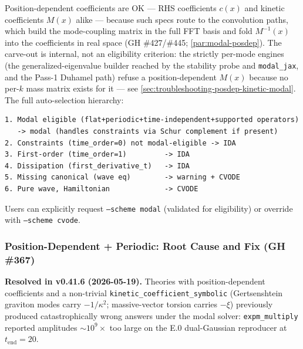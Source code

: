 Position-dependent coefficients are OK --- RHS coefficients $c(x)$ and
kinetic coefficients $M(x)$ alike --- because such specs route to the
convolution paths, which build the mode-coupling matrix in the full FFT
basis and fold $M^{-1}(x)$ into the coefficients in real space
(GH \#427/\#445; \cref{par:modal-posdep}).  The carve-out is internal, not
an eligibility criterion: the strictly per-mode engines (the
generalized-eigenvalue builder reached by the stability probe and
\texttt{modal\_jax}, and the Pass-1 Duhamel path) refuse a
position-dependent $M(x)$ because no per-$k$ mass matrix exists for it ---
see \cref{sec:troubleshooting-posdep-kinetic-modal}.  The full
auto-selection hierarchy:

\begin{lstlisting}[style=bash]
1. Modal eligible (flat+periodic+time-independent+supported operators)
   -> modal (handles constraints via Schur complement if present)
2. Constraints (time_order=0) not modal-eligible -> IDA
3. First-order (time_order=1)         -> IDA
4. Dissipation (first_derivative_t)   -> IDA
5. Missing canonical (wave eq)        -> warning + CVODE
6. Pure wave, Hamiltonian             -> CVODE
\end{lstlisting}

Users can explicitly request \texttt{--scheme modal} (validated for eligibility) or override with \texttt{--scheme cvode}.

\subsubsection{Position-Dependent + Periodic: Root Cause and Fix (GH \#367)}
\label{sec:modal-pos-dep-auto-route}

\textbf{Resolved in v0.41.6 (2026-05-19).} Theories with
position-dependent coefficients and a non-trivial
\texttt{kinetic\_coefficient\_symbolic} (Gertsenshtein graviton modes
carry $-1/\kappa^2$; massive-vector torsion carries $-\xi$) previously
produced catastrophically wrong answers under the modal solver:
\texttt{expm\_multiply} reported amplitudes $\sim 10^9 \times$ too large
on the E.0 dual-Gaussian reproducer at $t_{\mathrm{end}} = 20$.

